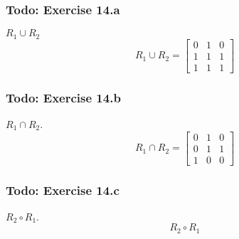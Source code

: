 \documentclass[12pt]{article}
\begin{document}
    \subsubsection{Todo: Exercise 14.a}
    $R_1 \cup R_2$
    \begin{equation}
        R_1 \cup R_2 = \begin{bmatrix}
            0 & 1 & 0 \\
            1 & 1 & 1 \\
            1 & 1 & 1
        \end{bmatrix}
    \end{equation}

    \subsubsection{Todo: Exercise 14.b}
    $ R_1 \cap R_2 $.
    \begin{equation}
        R_1 \cap R_2=
        \begin{bmatrix}
            0 & 1 & 0\\
            0 & 1 & 1\\
            1 & 0 & 0
        \end{bmatrix}
    \end{equation}
    
    \subsubsection{Todo: Exercise 14.c}
    $ R_2 \circ R_1$.
    \begin{equation}
        R_2 \circ R_1
    \end{equation}
\end{document}
